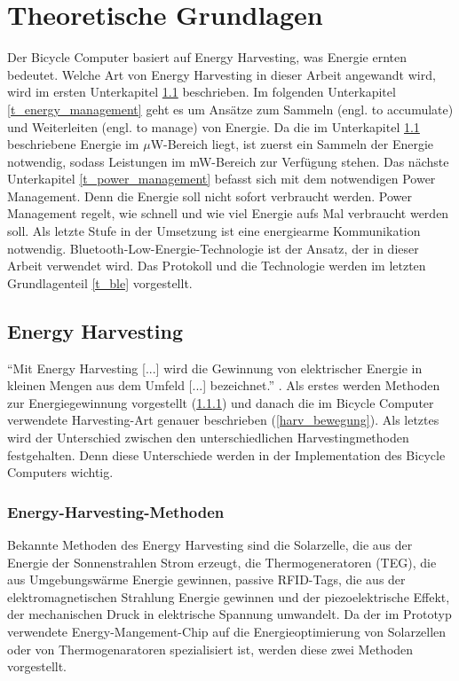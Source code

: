 \chapter{Theoretische Grundlagen}

Der Bicycle Computer basiert auf Energy Harvesting, was Energie ernten bedeutet. Welche Art von Energy Harvesting in dieser Arbeit angewandt wird, wird im ersten Unterkapitel \ref{t_harvesting} beschrieben. Im folgenden Unterkapitel \ref{t_energy_management} geht es um Ansätze zum Sammeln (engl. to accumulate) und Weiterleiten (engl. to manage) von Energie. Da die im Unterkapitel \ref{t_harvesting} beschriebene Energie im $\mu$W-Bereich liegt, ist zuerst ein Sammeln der Energie notwendig, sodass Leistungen im mW-Bereich zur Verfügung stehen. Das nächste Unterkapitel \ref{t_power_management} befasst sich mit dem notwendigen Power Management. Denn die
Energie soll nicht sofort verbraucht werden. Power Management regelt, wie schnell und wie viel Energie aufs Mal verbraucht werden soll. Als letzte Stufe in der Umsetzung ist eine energiearme Kommunikation notwendig. Bluetooth-Low-Energie-Technologie ist der Ansatz, der in dieser Arbeit verwendet wird. Das Protokoll und die Technologie werden im letzten Grundlagenteil \ref{t_ble} vorgestellt.


\section{Energy Harvesting}\label{t_harvesting} 

``Mit Energy Harvesting [...] wird die Gewinnung von elektrischer Energie in kleinen Mengen aus dem Umfeld [...] bezeichnet.'' \cite{harvesting}. Als erstes werden Methoden zur Energiegewinnung vorgestellt (\ref{harv_arten}) und danach die im Bicycle Computer verwendete Harvesting-Art genauer beschrieben (\ref{harv_bewegung}). Als letztes wird der Unterschied zwischen den unterschiedlichen Harvestingmethoden festgehalten. Denn diese Unterschiede werden in der Implementation des Bicycle Computers wichtig.


\subsection{Energy-Harvesting-Methoden}\label{harv_arten} 

Bekannte Methoden des Energy Harvesting sind die Solarzelle, die aus der Energie der Sonnenstrahlen Strom erzeugt, die Thermogeneratoren (TEG), die aus Umgebungswärme Energie gewinnen,  passive RFID-Tags, die aus der elektromagnetischen Strahlung Energie gewinnen und der piezoelektrische Effekt, der mechanischen Druck in elektrische Spannung umwandelt. Da der im Prototyp verwendete Energy-Mangement-Chip \cite{datasheet_EM85} auf die Energieoptimierung von Solarzellen oder von Thermogenaratoren spezialisiert ist, werden diese zwei Methoden vorgestellt. 


